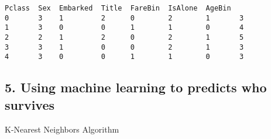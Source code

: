 \documentclass[11pt]{article}
\makeatletter
\newcommand{\boxspacing}{\kern\kvtcb@left@rule\kern\kvtcb@boxsep}
\newcommand{\prompt}[4]{
        {\ttfamily\llap{{\color{#2}[#3]:\hspace{3pt}#4}}\vspace{-\baselineskip}}
    }
\makeatother
\begin{document}
            \begin{tcolorbox}[breakable, size=fbox, boxrule=.5pt, pad at break*=1mm, opacityfill=0]
\prompt{Out}{outcolor}{39}{\boxspacing}
\begin{Verbatim}[commandchars=\\\{\}]
   Pclass  Sex  Embarked  Title  FareBin  IsAlone  AgeBin
0       3    1         2      0        2        1       3
1       3    0         0      1        1        0       4
2       2    1         2      0        2        1       5
3       3    1         0      0        2        1       3
4       3    0         0      1        1        0       3
\end{Verbatim}
\end{tcolorbox}
        
    \hypertarget{using-machine-learning-to-predicts-who-survives}{%
\subsection{5. Using machine learning to predicts who
survives}\label{using-machine-learning-to-predicts-who-survives}}

    K-Nearest Neighbors Algorithm
\end{document}
